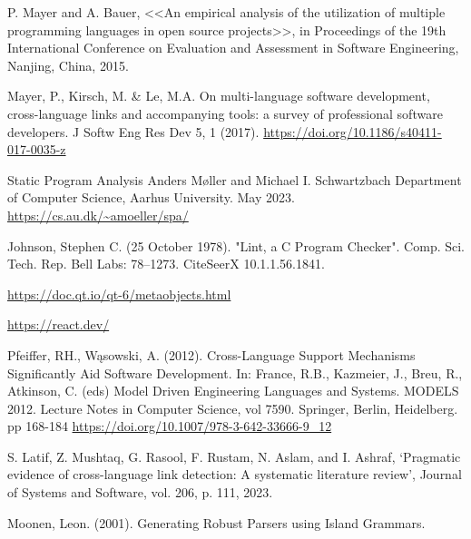 \begingroup
\renewcommand{\section}[2]{\anonsection{Библиографический список}}
\begin{thebibliography}{00}

    P. Mayer and A. Bauer, 
    <<An empirical analysis of the utilization of multiple programming languages in open source projects>>, 
    in Proceedings of the 19th International Conference on Evaluation and Assessment in Software Engineering, 
    Nanjing, China, 2015.

    Mayer, P., Kirsch, M. \& Le, M.A. On multi-language software development,
    cross-language links and accompanying tools: 
    a survey of professional software developers. 
    J Softw Eng Res Dev 5, 1 (2017). \url{https://doi.org/10.1186/s40411-017-0035-z}


    Static Program Analysis
    Anders Møller and Michael I. Schwartzbach
    Department of Computer Science, Aarhus University. May 2023.
    \url{https://cs.au.dk/~amoeller/spa/}

    Johnson, Stephen C. (25 October 1978).
    "Lint, a C Program Checker". 
    Comp. Sci. Tech. Rep. Bell Labs: 78–1273.
    CiteSeerX 10.1.1.56.1841. 

    \url{https://doc.qt.io/qt-6/metaobjects.html}

    \url{https://react.dev/}

    Pfeiffer, RH., Wąsowski, A. (2012).
    Cross-Language Support Mechanisms Significantly Aid Software Development.
    In: France, R.B., Kazmeier, J., Breu, R., Atkinson, C. (eds)
    Model Driven Engineering Languages and Systems. MODELS 2012. 
    Lecture Notes in Computer Science, vol 7590. Springer, Berlin, Heidelberg.
    pp 168-184
    \url{https://doi.org/10.1007/978-3-642-33666-9_12}
    
    S. Latif, Z. Mushtaq, G. Rasool, F. Rustam, N. Aslam,
    and I. Ashraf, ‘Pragmatic evidence of cross-language link detection:
    A systematic literature review’, Journal of Systems and Software,
    vol. 206, p. 111, 2023.

    Moonen, Leon. (2001). Generating Robust Parsers using Island Grammars. 
    

\end{thebibliography}
